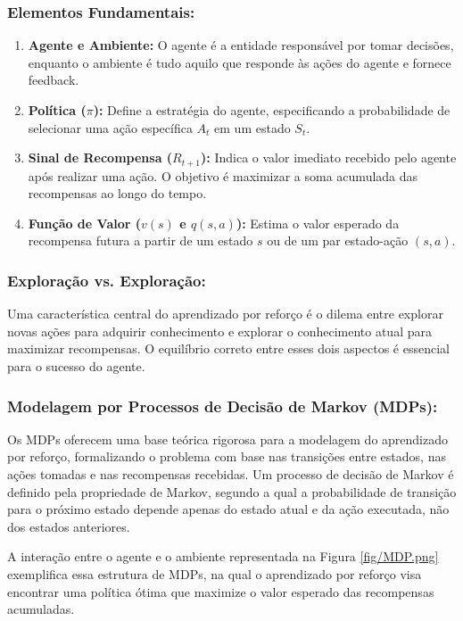 \subsubsection*{Elementos Fundamentais:}
\begin{enumerate}
    \item \textbf{Agente e Ambiente:} O agente é a entidade responsável por tomar decisões, enquanto o ambiente é tudo aquilo que responde às ações do agente e fornece feedback.
    \item \textbf{Política (\(\pi\)):} Define a estratégia do agente, especificando a probabilidade de selecionar uma ação específica \( A_t \) em um estado \( S_t \).
    \item \textbf{Sinal de Recompensa (\(R_{t+1}\)):} Indica o valor imediato recebido pelo agente após realizar uma ação. O objetivo é maximizar a soma acumulada das recompensas ao longo do tempo.
    \item \textbf{Função de Valor (\(v(s)\) e \(q(s, a)\)):} Estima o valor esperado da recompensa futura a partir de um estado \( s \) ou de um par estado-ação \( (s, a) \).
\end{enumerate}

\subsubsection*{Exploração vs. Exploração:}
Uma característica central do aprendizado por reforço é o dilema entre explorar novas ações para adquirir conhecimento e explorar o conhecimento atual para maximizar recompensas. O equilíbrio correto entre esses dois aspectos é essencial para o sucesso do agente.

\subsubsection*{Modelagem por Processos de Decisão de Markov (MDPs):}
Os MDPs oferecem uma base teórica rigorosa para a modelagem do aprendizado por reforço, formalizando o problema com base nas transições entre estados, nas ações tomadas e nas recompensas recebidas. Um processo de decisão de Markov é definido pela propriedade de Markov, segundo a qual a probabilidade de transição para o próximo estado depende apenas do estado atual e da ação executada, não dos estados anteriores.

A interação entre o agente e o ambiente representada na Figura \ref{fig/MDP.png} exemplifica essa estrutura de MDPs, na qual o aprendizado por reforço visa encontrar uma política ótima que maximize o valor esperado das recompensas acumuladas.


